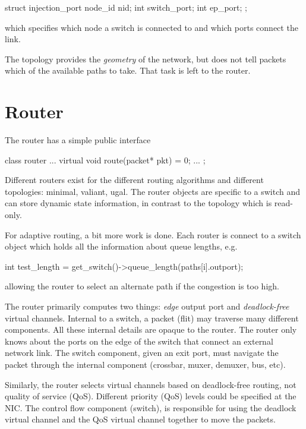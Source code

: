 \begin{CppCode}
struct injection_port {
  node_id nid;
  int switch_port;
  int ep_port;
};
\end{CppCode}
which specifies which node a switch is connected to and which ports connect the link.

The topology provides the \emph{geometry} of the network, but does not tell packets which of the available paths to take. 
That task is left to the router.


\section{Router}\label{sec:router}
The router has a simple public interface

\begin{CppCode}
class router {
...
  virtual void route(packet* pkt) = 0;
...
};
\end{CppCode}

Different routers exist for the different routing algorithms and different topologies: 	minimal, valiant, ugal.
The router objects are specific to a switch and can store dynamic state information,
in contrast to the topology which is read-only.

For adaptive routing, a bit more work is done.
Each router is connect to a switch object which holds all the information about queue lengths, e.g.

\begin{CppCode}
int test_length = get_switch()->queue_length(paths[i].outport);
\end{CppCode}
allowing the router to select an alternate path if the congestion is too high. 

The router primarily computes two things: \emph{edge} output port and \emph{deadlock-free} virtual channels.
Internal to a switch, a packet (flit) may traverse many different components.
All these internal details are opaque to the router.
The router only knows about the ports on the edge of the switch that connect an external network link. 
The switch component, given an exit port, must navigate the packet through the internal component (crossbar, muxer, demuxer, bus, etc).

Similarly, the router selects virtual channels based on deadlock-free routing, not quality of service (QoS).
Different priority (QoS) levels could be specified at the NIC.
The control flow component (switch), is responsible for using the deadlock virtual channel and the QoS virtual channel together to move the packets. 




